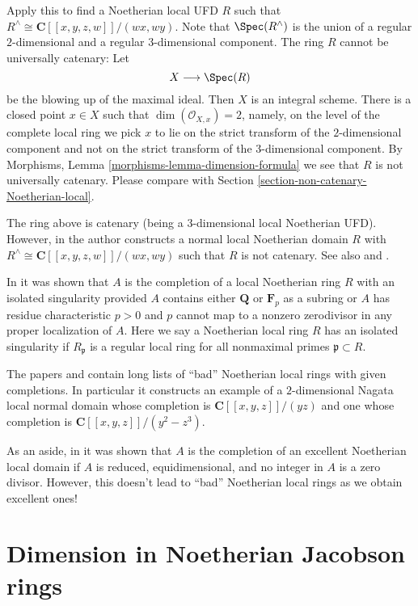 \medskip\noindent
Apply this to find a Noetherian local UFD $R$ such that
$R^\wedge \cong \mathbf{C}[[x, y, z, w]]/(wx, wy)$.
Note that $\Spec(R^\wedge)$ is the
union of a regular $2$-dimensional and a regular $3$-dimensional component.
The ring $R$ cannot be universally catenary: Let
$$
X \longrightarrow \Spec(R)
$$
be the blowing up of the maximal ideal. Then $X$ is an integral scheme.
There is a closed point $x \in X$ such that $\dim(\mathcal{O}_{X, x}) = 2$,
namely, on the level of the complete local ring we pick $x$ to lie on the
strict transform of the $2$-dimensional component and not on the strict
transform of the $3$-dimensional component. By
Morphisms, Lemma \ref{morphisms-lemma-dimension-formula}
we see that $R$ is not universally catenary. Please compare with
Section \ref{section-non-catenary-Noetherian-local}.

\medskip\noindent
The ring above is catenary (being a $3$-dimensional local Noetherian UFD).
However, in \cite{Ogoma-example} the author constructs a normal local
Noetherian domain $R$ with $R^\wedge \cong \mathbf{C}[[x, y, z, w]]/(wx, wy)$
such that $R$ is not catenary. See also \cite{Heitmann-Ogoma} and
\cite{Lech-YAPO}.

\medskip\noindent
In \cite{Heitmann-isolated} it was shown that $A$ is the completion
of a local Noetherian ring $R$ with an isolated singularity
provided $A$ contains either $\mathbf{Q}$ or $\mathbf{F}_p$ as a subring
or $A$ has residue characteristic $p > 0$ and $p$ cannot map to a
nonzero zerodivisor in any proper localization of $A$.
Here we say a Noetherian local ring $R$
has an isolated singularity if $R_\mathfrak p$ is
a regular local ring for all nonmaximal primes $\mathfrak p \subset R$.

\medskip\noindent
The papers \cite{Nishimura-few} and \cite{Nishimura-few-II}
contain long lists of ``bad'' Noetherian
local rings with given completions. In particular it constructs
an example of a $2$-dimensional Nagata local normal domain whose
completion is $\mathbf{C}[[x, y, z]]/(yz)$ and one whose completion
is $\mathbf{C}[[x, y, z]]/(y^2 - z^3)$.

\medskip\noindent
As an aside, in \cite{Loepp} it was shown that $A$ is the completion of an
excellent Noetherian local domain if $A$ is reduced, equidimensional,
and no integer in $A$ is a zero divisor. However, this doesn't lead
to ``bad'' Noetherian local rings as we obtain excellent ones!




\section{Dimension in Noetherian Jacobson rings}
\label{section-noetherian-jacobson}

